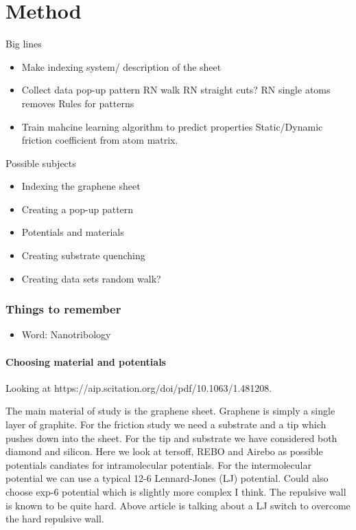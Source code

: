 \newpage
\chapter*{Method}




Big lines
\begin{itemize}
    \item Make indexing system/ description of the sheet 
    \item Collect data 
    \subitem pop-up pattern
    \subitem RN walk 
    \subitem RN straight cuts?
    \subitem RN single atoms removes
    \subitem Rules for patterns
    \item Train mahcine learning algorithm to predict properties
    \subitem Static/Dynamic friction coefficient from atom matrix. 
\end{itemize}    


Possible subjects
\begin{itemize}
    \item Indexing the graphene sheet
    \item Creating a pop-up pattern
    \item Potentials and materials
    \item Creating substrate
    \subitem quenching
    \item Creating data sets
    \subitem random walk?
\end{itemize}    


\subsection*{Things to remember}
\begin{itemize}
    \item Word: Nanotribology
\end{itemize}

\subsubsection*{Choosing material and potentials}

Looking at https://aip.scitation.org/doi/pdf/10.1063/1.481208.

The main material of study is the graphene sheet. Graphene is simply a single layer of graphite. For the friction study we need a substrate and a tip which pushes down into the sheet. For the tip and substrate we have considered both diamond and silicon. Here we look at tersoff, REBO and Airebo as possible potentials candiates for intramolecular potentials. For the intermolecular potential we can use a typical 12-6 Lennard-Jones (LJ) potential. Could also choose exp-6 potential which is slightly more complex I think. The repulsive wall is known to be quite hard. Above article is talking about a LJ switch to overcome the hard repulsive wall.  


